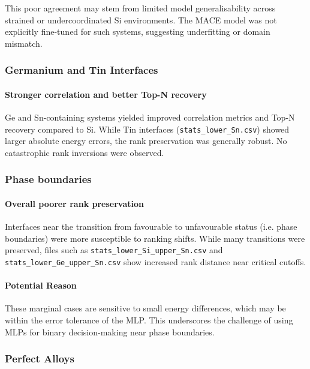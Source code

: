 This poor agreement may stem from limited model generalisability across strained or undercoordinated Si environments. The MACE model was not explicitly fine-tuned for such systems, suggesting underfitting or domain mismatch.

\subsubsection{Germanium and Tin Interfaces}

\paragraph{Stronger correlation and better Top-N recovery}

Ge and Sn-containing systems yielded improved correlation metrics and Top-N recovery compared to Si. While Tin interfaces (\texttt{stats\_lower\_Sn.csv}) showed larger absolute energy errors, the rank preservation was generally robust. No catastrophic rank inversions were observed.

\subsubsection{Phase boundaries}

\paragraph{Overall poorer rank preservation}

Interfaces near the transition from favourable to unfavourable status (i.e. phase boundaries) were more susceptible to ranking shifts. While many transitions were preserved, files such as \texttt{stats\_lower\_Si\_upper\_Sn.csv} and \texttt{stats\_lower\_Ge\_upper\_Sn.csv} show increased rank distance near critical cutoffs.

\paragraph{Potential Reason}

These marginal cases are sensitive to small energy differences, which may be within the error tolerance of the MLP. This underscores the challenge of using MLPs for binary decision-making near phase boundaries.

\subsubsection{Perfect Alloys}

